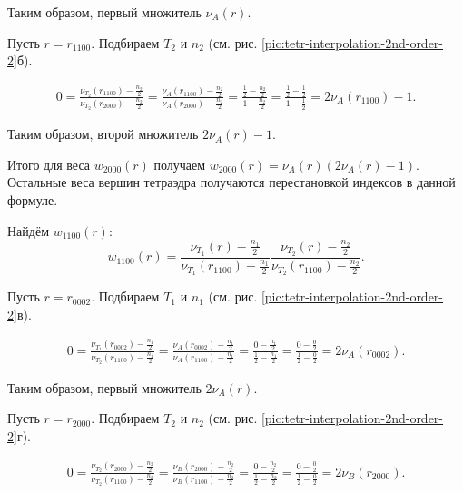 Таким образом, первый множитель $\nu_{A}(r)$.

Пусть $r = r_{1100}$. Подбираем $T_2$ и $n_2$ (см. рис. \ref{pic:tetr-interpolation-2nd-order-2}б).

\begin{align}
0 = \frac{ \nu_{T_2}(r_{1100}) - \frac{n_2}{2} }{ \nu_{T_2}(r_{2000}) - \frac{n_2}{2} } = \frac{ \nu_{A}(r_{1100}) - \frac{n_2}{2} }{ \nu_{A}(r_{2000}) - \frac{n_2}{2} } = \frac{ \frac{1}{2} - \frac{n_2}{2} }{ 1 - \frac{n_2}{2} } = \frac{ \frac{1}{2} - \frac{1}{2} }{ 1 - \frac{1}{2} } = 2\nu_{A}(r_{1100}) - 1.
\end{align}

Таким образом, второй множитель $2\nu_{A}(r)-1$.

Итого для веса $w_{2000}(r)$ получаем $w_{2000}(r) = \nu_{A}(r) (2\nu_{A}(r)-1)$. Остальные веса вершин тетраэдра получаются перестановкой индексов в данной формуле.

Найдём $w_{1100}(r)$:
\begin{equation}
w_{1100}(r) = \frac{ \nu_{T_1}(r) - \frac{n_1}{2} }{ \nu_{T_1}(r_{1100}) - \frac{n_1}{2} } \frac{ \nu_{T_2}(r) - \frac{n_2}{2} }{ \nu_{T_2}(r_{1100}) - \frac{n_2}{2} }.
\end{equation}

Пусть $r = r_{0002}$. Подбираем $T_1$ и $n_1$ (см. рис. \ref{pic:tetr-interpolation-2nd-order-2}в).

\begin{align}
0 = \frac{ \nu_{T_1}(r_{0002}) - \frac{n_1}{2} }{ \nu_{T_2}(r_{1100}) - \frac{n_1}{2} } = \frac{ \nu_{A}(r_{0002}) - \frac{n_1}{2} }{ \nu_{A}(r_{1100}) - \frac{n_1}{2} } = \frac{ 0 - \frac{n_1}{2} }{ \frac{1}{2} - \frac{n_1}{2} } = \frac{ 0 - \frac{0}{2} }{ \frac{1}{2} - \frac{0}{2} } = 2\nu_{A}(r_{0002}).
\end{align}

Таким образом, первый множитель $2\nu_{A}(r)$.

Пусть $r = r_{2000}$. Подбираем $T_2$ и $n_2$ (см. рис. \ref{pic:tetr-interpolation-2nd-order-2}г).

\begin{align}
0 = \frac{ \nu_{T_2}(r_{2000}) - \frac{n_2}{2} }{ \nu_{T_2}(r_{1100}) - \frac{n_2}{2} } = \frac{ \nu_{B}(r_{2000}) - \frac{n_2}{2} }{ \nu_{B}(r_{1100}) - \frac{n_2}{2} } = \frac{ 0 - \frac{n_2}{2} }{ \frac{1}{2} - \frac{n_2}{2} } = \frac{ 0 - \frac{0}{2} }{ \frac{1}{2} - \frac{0}{2} } = 2\nu_{B}(r_{2000}).
\end{align}

